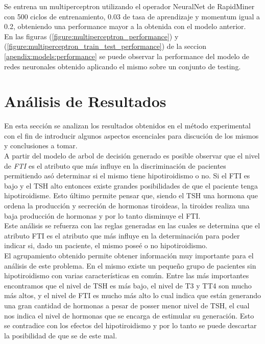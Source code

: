 \documentclass[osajnl,twocolumn,showpacs,superscriptaddress,10pt,floatfix]{revtex4-1} %
\begin{document}
Se entrena un multiperceptron utilizando el operador NeuralNet de RapidMiner con 500 ciclos de entrenamiento, 0.03 de tasa de aprendizaje y momentum igual a 0.2, obteniendo una performance mayor a la obtenida con el modelo anterior. \\

En las figuras (\ref{figure:multiperceptron_performance}) y (\ref{figure:multiperceptron_train_test_performance}) de la seccion \ref{apendix:models:performance} se puede observar la performance del modelo de redes neuronales obtenido aplicando el mismo sobre un conjunto de testing. \\

\section{Análisis de Resultados}

En esta sección se analizan los resultados obtenidos en el método experimental con el fin de introducir algunos aspectos escenciales para discución de los mismos y conclusiones a tomar. \\

A partir del modelo de arbol de decisión generado es posible observar que el nivel de \textit{FTI} es el atributo que más influye en la discriminación de pacientes permitiendo asó determinar si el mismo tiene hipotiroidismo o no. Si el FTI es bajo y el TSH alto entonces existe grandes posibilidades de que el paciente tenga hipotiroidisme. Esto último permite pensar que, siendo el TSH una hormona que ordena la producción y secreción de hormonas tiroideas, la tiroides realiza una baja producción de hormonas y por lo tanto disminuye el FTI. \\

Este análisis se refuerza con las reglas generadas en las cuales se determina que el atributo FTI es el atributo que más influye en la determinación para poder indicar si, dado un paciente, el mismo poseé o no hipotiroidismo. \\

El agrupamiento obtenido permite obtener información muy importante para el análisis de este problema. En el mismo existe un pequeño grupo de pacientes sin hipotiroidismo con varias características en común. Entre las más importantes encontramos que el nivel de TSH es más bajo, el nivel de T3 y TT4 son mucho más altos, y el nivel de FTI es mucho más alto lo cual indica que están generando una gran cantidad de hormonas a pesar de posser menor nivel de TSH, el cual nos indica el nivel de hormonas que se encarga de estimular su generación. Esto se contradice con los efectos del hipotiroidismo y por lo tanto se puede descartar la posibilidad de que se de este mal. \\
\end{document}
